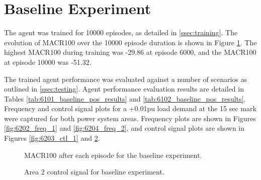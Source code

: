 \section{Baseline Experiment}\label{sec:baseline}
The agent was trained for 10000 episodes, as detailed in \textsection \ref{ssec:training}. The evolution of MACR100 over the 10000 episode duration is shown in Figure \ref{fig:6201_average_reward}. The highest MACR100 during training was -29.86 at episode 6000, and the MACR100 at episode 10000 was -51.32.

The trained agent performance was evaluated against a number of scenarios as outlined in \textsection \ref{ssec:testing}. Agent performance evaluation results are detailed in Tables \ref{tab:6101_baseline_pos_results} and \ref{tab:6102_baseline_pos_results}. Frequency and control signal plots for a +0.01pu load demand at the 15 sec mark were captured for both power system areas. Frequency plots are shown in Figures \ref{fig:6202_freq_1} and \ref{fig:6204_freq_2}, and control signal plots are shown in Figures \ref{fig:6203_ctl_1} and \ref{fig:6205_ctl_2}.

\begin{figure}[h]
	\centering
	
	\caption{MACR100 after each episode for the baseline experiment.}
	\label{fig:6201_average_reward}
\end{figure}





\begin{figure}[h]
	\centering
	
	\vspace{-0.5cm}
	\caption[Experiment 1 Area 1 frequency]{Area 1 frequency response for baseline experiment.}\label{fig:6202_freq_1}
	
	\vspace{0.5cm}
	
	
	\vspace{-0.5cm}
	\caption[Experiment 1 Area 1 control signal]{Area 1 control signal for baseline experiment.}\label{fig:6203_ctl_1}
	
	\vspace{0.5cm}
	
	
	\vspace{-0.5cm}
	\caption[Experiment 1 Area 2 frequency]{Area 2 frequency response for baseline experiment.}\label{fig:6204_freq_2}
	
	\vspace{0.5cm}
		
	
	\vspace{-0.5cm}
	\caption[Experiment 1 Area 2 control signal]{Area 2 control signal for baseline experiment.}\label{fig:6205_ctl_2}
\end{figure}